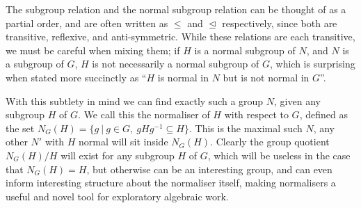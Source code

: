 The subgroup relation and the normal subgroup relation can be thought of as a partial order, and are often written as $\leq$ and $\trianglelefteq$ respectively, since both are transitive, reflexive, and anti-symmetric. While these relations are each transitive, we must be careful when mixing them; if $H$ is a normal subgroup of $N$, and $N$ is a subgroup of $G$, $H$ is not necessarily a normal subgroup of $G$, which is surprising when stated more succinctly as ``$H$ is normal in $N$ but is not normal in $G$''.

With this subtlety in mind we can find exactly such a group $N$, given any subgroup $H$ of $G$. We call this the normaliser of $H$ with respect to $G$, defined as the set $N_G(H) = \{g\ |\ g \in G,\ gHg^{-1} \subseteq H\}$. This is the maximal such $N$, any other $N'$ with $H$ normal will sit inside $N_G(H)$. Clearly the group quotient $N_G(H)/H$ will exist for any subgroup $H$ of $G$, which will be useless in the case that $N_G(H) = H$, but otherwise can be an interesting group, and can even inform interesting structure about the normaliser itself, making normalisers a useful and novel tool for exploratory algebraic work.

